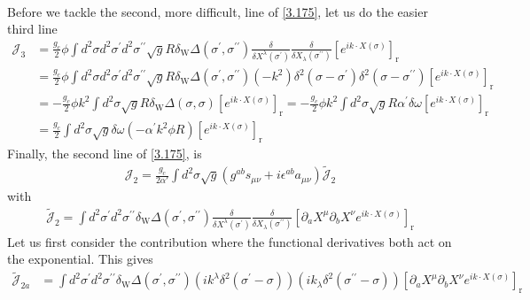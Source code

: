 \begin{tcolorbox}[breakable]
\begin{align}
		\end{align}
		Before we tackle the second, more difficult, line of \eqref{3.175}, let us do the easier third line
		\begin{align}
			\mathcal{J}_3 &= \frac{g_c}{2} \phi \int d^2 \sigma d^2 \sigma^{\prime} d^2 \sigma^{\prime \prime} \sqrt{g} R \delta_{\mathrm{W}} \Delta\left(\sigma^{\prime}, \sigma^{\prime \prime}\right) \frac{\delta}{\delta X^\lambda\left(\sigma^{\prime}\right)} \frac{\delta}{\delta X_\lambda\left(\sigma^{\prime \prime}\right)}\left[e^{i k \cdot X(\sigma)}\right]_{\mathrm{r}} \nonumber \\
			&= \frac{g_c}{2} \phi \int d^2 \sigma d^2 \sigma^{\prime} d^2 \sigma^{\prime \prime} \sqrt{g} R \delta_{\mathrm{W}} \Delta\left(\sigma^{\prime}, \sigma^{\prime \prime}\right)\left(-k^2\right) \delta^2\left(\sigma-\sigma^{\prime}\right) \delta^2\left(\sigma-\sigma^{\prime \prime}\right)\left[e^{i k \cdot X(\sigma)}\right]_{\mathrm{r}} \nonumber \\
			&= -\frac{g_c}{2} \phi k^2 \int d^2 \sigma \sqrt{g} R \delta_{\mathrm{W}} \Delta(\sigma, \sigma)\left[e^{i k \cdot X(\sigma)}\right]_{\mathrm{r}} = -\frac{g_c}{2} \phi k^2 \int d^2 \sigma \sqrt{g} R \alpha^{\prime} \delta \omega\left[e^{i k \cdot X(\sigma)}\right]_{\mathrm{r}} \nonumber \\
			&= \frac{g_c}{2} \int d^2 \sigma \sqrt{g} \delta \omega\left(-\alpha^{\prime} k^2 \phi R\right)\left[e^{i k \cdot X(\sigma)}\right]_{\mathrm{r}}
		\end{align}
		Finally, the second line of \eqref{3.175}, is
		\begin{align}
			\mathcal{J}_2 = \frac{g_c}{2 \alpha'} \int d^2 \sigma \sqrt{g}\left(g^{a b} s_{\mu \nu}+i \epsilon^{a b} a_{\mu \nu}\right) \tilde{\mathcal{J}}_2
		\end{align}
		with
		\begin{align}
			\tilde{\mathcal{J}}_2 = \int d^2 \sigma^{\prime} d^2 \sigma^{\prime \prime} \delta_{\mathrm{W}} \Delta\left(\sigma^{\prime}, \sigma^{\prime \prime}\right) \frac{\delta}{\delta X^\lambda\left(\sigma^{\prime}\right)} \frac{\delta}{\delta X_\lambda\left(\sigma^{\prime \prime}\right)}\left[\partial_a X^\mu \partial_b X^\nu e^{i k \cdot X(\sigma)}\right]_{\mathrm{r}}
		\end{align}
		Let us first consider the contribution where the functional derivatives both act on the exponential. This gives
		\begin{align}
			\tilde{\mathcal{J}}_{2 a} &= \int d^2 \sigma^{\prime} d^2 \sigma^{\prime \prime} \delta_{\mathrm{W}} \Delta\left(\sigma^{\prime}, \sigma^{\prime \prime}\right)\left(i k^\lambda \delta^2\left(\sigma^{\prime}-\sigma\right)\right)\left(i k_\lambda \delta^2\left(\sigma^{\prime \prime}-\sigma\right)\right)\left[\partial_a X^\mu \partial_b X^\nu e^{i k \cdot X(\sigma)}\right]_{\mathrm{r}} \nonumber \\

\end{align}
\end{tcolorbox}
